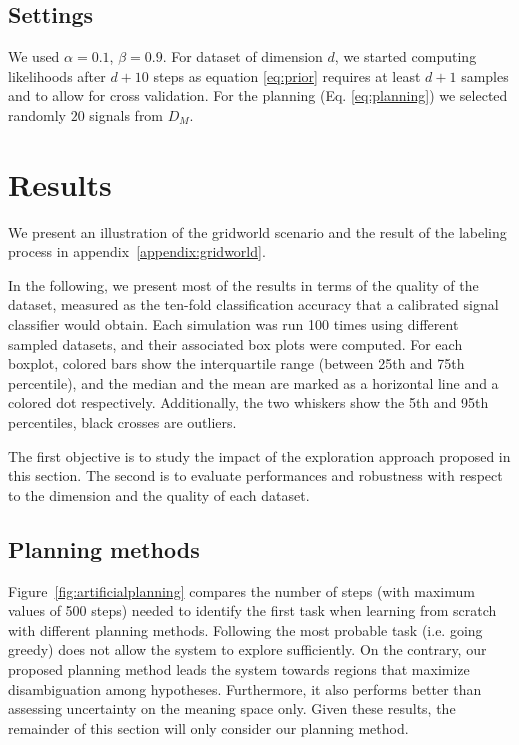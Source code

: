 \subsection{Settings}

We used $\alpha = 0.1$, $\beta = 0.9$. For dataset of dimension $d$, we started computing likelihoods after $d+10$ steps as equation \ref{eq:prior} requires at least $d+1$ samples and to allow for cross validation. For the planning (Eq. \ref{eq:planning}) we selected randomly $20$ signals from $D_M$.


\section{Results}

We present an illustration of the gridworld scenario and the result of the labeling process in appendix~\ref{appendix:gridworld}.

In the following, we present most of the results in terms of the quality of the dataset, measured as the ten-fold classification accuracy that a calibrated signal classifier would obtain. Each simulation was run 100 times using different sampled datasets, and their associated box plots were computed. For each boxplot, colored bars show the interquartile range (between 25th and 75th percentile), and the median and the mean are marked as a horizontal line and a colored dot respectively. Additionally, the two whiskers show the 5th and 95th percentiles, black crosses are outliers. 

The first objective is to study the impact of the exploration approach proposed in this section. The second is to evaluate performances and robustness with respect to the dimension and the quality of each dataset.

\subsection{Planning methods}

Figure~\ref{fig:artificialplanning} compares the number of steps (with maximum values of 500 steps) needed to identify the first task when learning from scratch with different planning methods. Following the most probable task (i.e. going greedy) does not allow the system to explore sufficiently. On the contrary, our proposed planning method leads the system towards regions that maximize disambiguation among hypotheses. Furthermore, it also performs better than assessing uncertainty on the meaning space only. Given these results, the remainder of this section will only consider our planning method.

